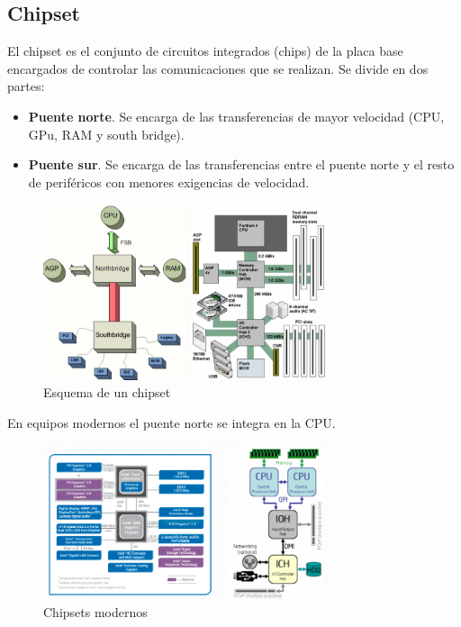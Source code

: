\documentclass[12pt,spanish]{article}
\begin{document}
\subsection{Chipset}
El chipset es el conjunto de circuitos integrados (chips) de la placa base encargados de controlar las comunicaciones que se realizan. Se divide en dos partes:
\begin{itemize}
	\item \textbf{Puente norte}. Se encarga de las transferencias de mayor velocidad (CPU, GPu, RAM y south bridge).
	\item \textbf{Puente sur}. Se encarga de las transferencias entre el puente norte y el resto de periféricos con menores exigencias de velocidad.
\end{itemize}
\begin{figure}[H]
	\centering
	\includegraphics[width=0.75\textwidth]{chipset.png}
	\caption{Esquema de un chipset}
\end{figure}
En equipos modernos el puente norte se integra en la CPU.
\begin{figure}[H]
	\centering
	\includegraphics[width=0.75\textwidth]{newchipsets.png}
	\caption{Chipsets modernos}
\end{figure}
\end{document}
